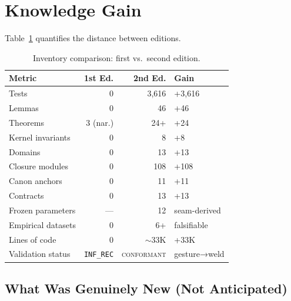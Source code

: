 \documentclass[
  aps,
  prd,
  preprint,
  superscriptaddress,
  nofootinbib,
  floatfix,
  longbibliography
]{revtex4-2}
\newcommand{\INF}{\texttt{INF\_REC}}
\newcommand{\regime}[1]{\textnormal{\textsc{#1}}}
\newcommand{\conform}{\regime{conformant}}
\begin{document}
\section{Knowledge Gain}\label{sec:gain}

Table~\ref{tab:gain} quantifies the distance between editions.

\begin{table}[t]
\centering
\small
\caption{Inventory comparison: first vs.\ second edition.}
\label{tab:gain}
\begin{tabular}{@{}lrrl@{}}
\toprule
\textbf{Metric} & \textbf{1st Ed.} & \textbf{2nd Ed.} & \textbf{Gain} \\
\midrule
Tests               & 0       & 3{,}616  & +3{,}616 \\
Lemmas              & 0       & 46       & +46 \\
Theorems            & 3 (nar.)& 24+      & +24 \\
Kernel invariants   & 0       & 8        & +8 \\
Domains             & 0       & 13       & +13 \\
Closure modules     & 0       & 108      & +108 \\
Canon anchors       & 0       & 11       & +11 \\
Contracts           & 0       & 13       & +13 \\
Frozen parameters   & —       & 12       & seam-derived \\
Empirical datasets  & 0       & 6+       & falsifiable \\
Lines of code       & 0       & $\sim$33K & +33K \\
Validation status   & \INF    & \conform{} & gesture→weld \\
\bottomrule
\end{tabular}
\end{table}

\subsection{What Was Genuinely New (Not Anticipated)}
\end{document}
